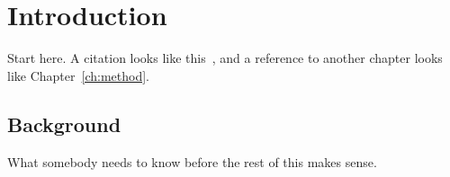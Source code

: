 \chapter{Introduction}
\label{ch:introduction}

Start here. A citation looks like this~\cite{knuth1984}, and a reference to
another chapter looks like Chapter~\ref{ch:method}.

\section{Background}

What somebody needs to know before the rest of this makes sense.
